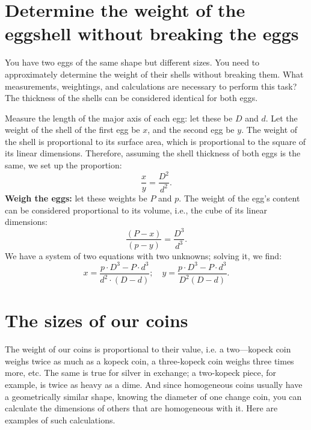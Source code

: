 \section[Weight of the eggshell]{Determine the weight of the eggshell without breaking the eggs}
\label{sec-11.9}


\ques You have two eggs of the same shape but different sizes. You need to approximately determine the weight of their shells without breaking them. What measurements, weightings, and calculations are necessary to perform this task? The thickness of the shells can be considered identical for both eggs.



\ans Measure the length of the major axis of each egg: let these be \( D \) and \( d \). Let the weight of the shell of the first egg be \( x \), and the second egg be \( y \). The weight of the shell is proportional to its surface area, which is proportional to the square of its linear dimensions. Therefore, assuming the shell thickness of both eggs is the same, we set up the proportion:
\begin{equation*}%
\frac{x}{y} = \frac{D^2}{d^2}.
\end{equation*}
\textbf{Weigh the eggs:} let these weights be \( P \) and \( p \). The weight of the egg's content can be considered proportional to its volume, i.e., the cube of its linear dimensions:
\begin{equation*}%
\frac{(P - x)}{(p - y)} = \frac{D^3}{d^3}.
\end{equation*}
We have a system of two equations with two unknowns; solving it, we find:
\begin{equation*}%
x = \frac{p \cdot D^3 - P \cdot d^3}{d^2 \cdot (D - d)}; \quad
y = \frac{p \cdot D^3 - P \cdot d^3}{D^2 (D - d)}.
\end{equation*}


\section{The sizes of our coins}
\label{sec-11.10}

The weight of our coins is proportional to their value, i.e. a two—kopeck coin weighs twice as much as a kopeck coin, a three-kopeck coin weighs three times more, etc. The same is true for silver in exchange; a two-kopeck piece, for example, is twice as heavy as a dime. And since homogeneous coins usually have a geometrically similar shape, knowing the diameter of one change coin, you can calculate the dimensions of others that are homogeneous with it. Here are examples of such calculations.

